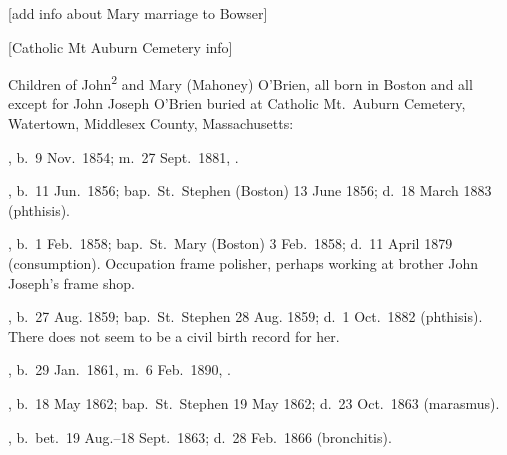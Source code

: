 [add info about Mary marriage to Bowser]

[Catholic Mt Auburn Cemetery info]

\begin{KidsIntro}
	Children of John\textsuperscript{2} and Mary (Mahoney) O'Brien, all born in Boston and all except for John Joseph O'Brien buried at Catholic Mt.\ Auburn Cemetery, Watertown, Middlesex County, Massachusetts:\cite{BillMcEvoy}
\end{KidsIntro}

\begin{Kids}
	, b.\ 9 Nov.\ 1854; m.\ 27 Sept.\ 1881, .
	
	, b.\ 11 Jun.\ 1856;\cite{Mary3OBrienBirth} bap.\ St.\ Stephen (Boston) 13 June 1856;\cite{Mary3OBrienBaptism} d.\ 18 March 1883 (phthisis).\cite{Mary3OBrienDeath}
	
	, b.\ 1 Feb.\ 1858;\cite{James3OBrienBirth} bap.\ St.\ Mary (Boston) 3 Feb.\ 1858;\cite{James3OBrienBaptism} d.\ 11 April 1879 (consumption). Occupation frame polisher,\cite{James3OBrienDeath} perhaps working at brother John Joseph's frame shop.
	
	, b.\ 27 Aug. 1859;\cite{Ellen3OBrienBaptism} bap.\ St.\ Stephen 28 Aug. 1859;\cite{Ellen3OBrienBaptism} d.\ 1 Oct.\ 1882 (phthisis).\cite{Ellen3OBrienDeath} There does not seem to be a civil birth record for her.
	
	, b.\ 29 Jan.\ 1861, m.\ 6 Feb.\ 1890, .
	
	, b.\ 18 May 1862;\cite{Margaret3OBrienBaptism} bap.\ St.\ Stephen 19 May 1862;\cite{Margaret3OBrienBaptism} d.\ 23 Oct.\ 1863 (marasmus).\cite{Margaret3OBrienDeath}
	
	, b.\ bet.\ 19 Aug.--18 Sept.\ 1863;\cite{Anna3OBrienDeath} d.\ 28 Feb.\ 1866 (bronchitis).\cite{Anna3OBrienDeath}
	
\end{Kids}